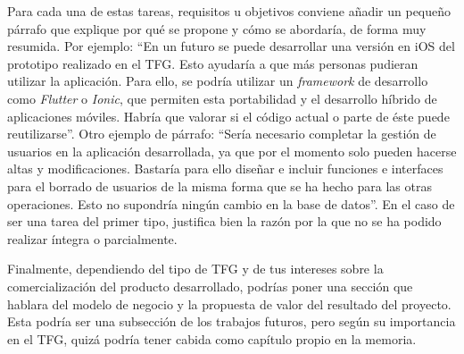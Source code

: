  Para cada una de estas tareas, requisitos u objetivos conviene añadir un pequeño párrafo que explique por qué se propone y cómo se abordaría, de forma muy resumida. Por ejemplo: ``En un futuro se puede desarrollar una versión en iOS del prototipo realizado en el TFG. Esto ayudaría a que más personas pudieran utilizar la aplicación. Para ello, se podría utilizar un \textit{framework} de desarrollo como \textit{Flutter} o \textit{Ionic}, que permiten esta portabilidad y el desarrollo híbrido de aplicaciones móviles. Habría que valorar si el código actual o parte de éste puede reutilizarse''. Otro ejemplo de párrafo: ``Sería necesario completar la gestión de usuarios en la aplicación desarrollada, ya que por el momento solo pueden hacerse altas y modificaciones. Bastaría para ello diseñar e incluir funciones e interfaces para el borrado de usuarios de la misma forma que se ha hecho para las otras operaciones. Esto no supondría ningún cambio en la base de datos''.  En el caso de ser una tarea del primer tipo, justifica bien la razón por la que no se ha podido realizar íntegra o parcialmente. 

 Finalmente, dependiendo del tipo de TFG y de tus intereses sobre la comercialización del producto desarrollado, podrías poner una sección que hablara del modelo de negocio y la propuesta de valor del resultado del proyecto. Esta podría ser una subsección de los trabajos futuros, pero según su importancia en el TFG, quizá podría tener cabida como capítulo propio en la memoria.
 